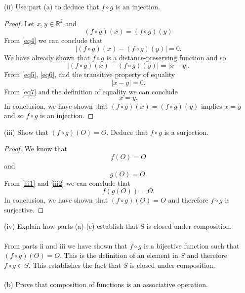\documentclass[11pt,a4paper]{article}
\begin{document}
(ii) Use part (a) to deduce that $f \circ g$ is an injection.\\

\begin{proof}
Let $x,y\in\mathbb{R}^2$ and
\begin{equation}\label{eq4}
(f\circ g)(x) = (f\circ g)(y)
\end{equation}
From \eqref{eq4} we can conclude that
\begin{equation}\label{eq5}
|(f\circ g)(x) - (f\circ g)(y)| = 0.
\end{equation}
We have already shown that $f\circ g$ is a distance-preserving function and so
\begin{equation}\label{eq6}
|(f\circ g)(x) - (f\circ g)(y)| = |x-y|.
\end{equation}
From \eqref{eq5}, \eqref{eq6}, and the transitive property of equality
\begin{equation}\label{eq7}
|x-y| = 0.
\end{equation}
From \eqref{eq7} and the definition of equality we can conclude
\[x=y.\]
In conclusion, we have shown that $(f\circ g)(x) = (f\circ g)(y)$ implies $x=y$ and so $f\circ g$ is an injection.
\end{proof}

(iii) Show that $(f \circ g)(O) = O$. Deduce that $f \circ g$ is a surjection.

\begin{proof}
We know that
\begin{equation}\label{iii1}
f(O) = O
\end{equation}
and
\begin{equation}\label{iii2}
g(O) = O.
\end{equation}
From \eqref{iii1} and \eqref{iii2} we can conclude that
\[f(g(O)) = O.\]
In conclusion, we have shown that $(f\circ g)(O) = O$ and therefore $f\circ g$ is surjective.

\end{proof}

(iv) Explain how parts (a)-(c) establish that S is closed under composition.\\
~\\
From parts ii and iii we have shown that $f\circ g$ is a bijective function such that $(f\circ g)(O) = O$. This is the definition of an element in $S$ and therefore $f\circ g\in S$. This establishes the fact that $S$ is closed under composition.\\
~\\
(b) Prove that composition of functions is an associative operation.
\end{document}
